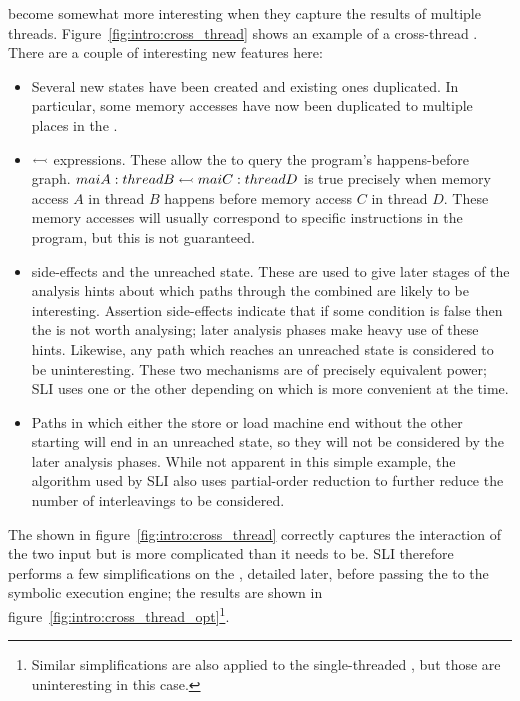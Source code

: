 \STateMachines become somewhat more interesting when they capture the
results of multiple threads.  Figure~\ref{fig:intro:cross_thread}
shows an example of a cross-thread \StateMachine.  There are a couple
of interesting new features here:

\begin{itemize}
\item Several new states have been created and existing ones
  duplicated.  In particular, some memory accesses have now been
  duplicated to multiple places in the \StateMachine.
\item
  $\leftarrowtail$ expressions.  These allow the {\StateMachine} to
  query the program's happens-before graph.  $maiA:threadB
  \leftarrowtail maiC:threadD$ is true precisely when memory access
  $A$ in thread $B$ happens before memory access $C$ in thread $D$.
  These memory accesses will usually correspond to specific
  instructions in the program, but this is not guaranteed.
\item
   side-effects and the unreached state.  These are used to
  give later stages of the analysis hints about which paths through
  the combined {\StateMachine} are likely to be interesting.  Assertion
  side-effects indicate that if some condition is false then the
  {\StateMachine} is not worth analysing; later analysis phases make
  heavy use of these hints.  Likewise, any path which reaches an
  unreached state is considered to be uninteresting.  These two
  mechanisms are of precisely equivalent power; SLI uses one or the
  other depending on which is more convenient at the time.
\item
  Paths in which either the store or load machine end without the
  other starting will end in an unreached state, so they will not be
  considered by the later analysis phases.  While not apparent in this
  simple example, the algorithm used by SLI also uses partial-order
  reduction\needCite{} to further reduce the number of interleavings
  to be considered.
\end{itemize}

The {\StateMachine} shown in figure~\ref{fig:intro:cross_thread}
correctly captures the interaction of the two input \StateMachines but
is more complicated than it needs to be.  SLI therefore performs a few
simplifications on the \StateMachine, detailed later, before passing
the {\StateMachine} to the symbolic execution engine; the results are
shown in figure~\ref{fig:intro:cross_thread_opt}\footnote{Similar
  simplifications are also applied to the single-threaded
  \StateMachines, but those are uninteresting in this case.}.

